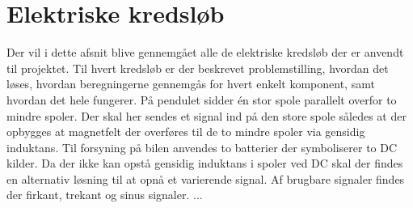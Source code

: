 
\section{Elektriske kredsløb}\label{sec:sec_sparningsreg}
Der vil i dette afsnit blive gennemgået alle de elektriske kredsløb der er anvendt til projektet. 
Til hvert kredsløb er der beskrevet problemstilling, hvordan det løses, hvordan beregningerne gennemgås for hvert enkelt komponent, samt hvordan det hele fungerer.
På pendulet sidder én stor spole parallelt overfor to mindre spoler. 
Der skal her sendes et signal ind på den store spole således at der opbygges at magnetfelt der overføres til de to mindre spoler via gensidig induktans. 
Til forsyning på bilen anvendes to batterier der symboliserer to DC kilder. 
Da der ikke kan opstå gensidig induktans i spoler ved DC skal der findes en alternativ løsning til at opnå et varierende signal. 
Af brugbare signaler findes der firkant, trekant og sinus signaler.
...
